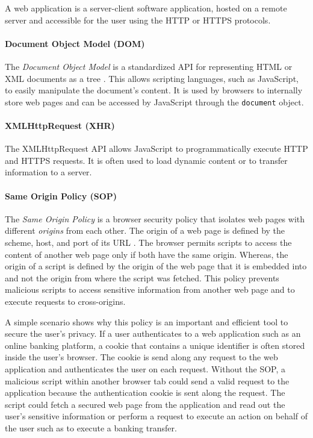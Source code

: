 	A web application is a server-client software application, hosted on a remote server and accessible for the user using the HTTP or HTTPS protocols.

\paragraph{Document Object Model (DOM)}

	The \textit{Document Object Model} is a standardized API for representing HTML or XML documents as a tree \cite{w3cDOMSpecification}. This allows scripting languages, such as JavaScript, to easily manipulate the document's content. It is used by browsers to internally store web pages and can be accessed by JavaScript through the \texttt{document} object. 

\paragraph{XMLHttpRequest (XHR)}

	The XMLHttpRequest API allows JavaScript to programmatically execute HTTP and HTTPS requests. It is often used to load dynamic content or to transfer information to a server. 

\paragraph{Same Origin Policy (SOP)}
	
	The \textit{Same Origin Policy} is a browser security policy that isolates web pages with different \textit{origins} from each other. The origin of a web page is defined by the scheme, host, and port of its URL \cite{w3cOriginSpecification}. The browser permits scripts to access the content of another web page only if both have the same origin. Whereas, the origin of a script is defined by the origin of the web page that it is embedded into and not the origin from where the script was fetched. This policy prevents malicious scripts to access sensitive information from another web page and to execute requests to cross-origins. 
	
	A simple scenario shows why this policy is an important and efficient tool to secure the user's privacy. If a user authenticates to a web application such as an online banking platform, a cookie that contains a unique identifier is often stored inside the user's browser. The cookie is send along any request to the web application and authenticates the user on each request. Without the SOP, a malicious script within another browser tab could send a valid request to the application because the authentication cookie is sent along the request. The script could fetch a secured web page from the application and read out the user's sensitive information or perform a request to execute an action on behalf of the user such as to execute a banking transfer.  
	
